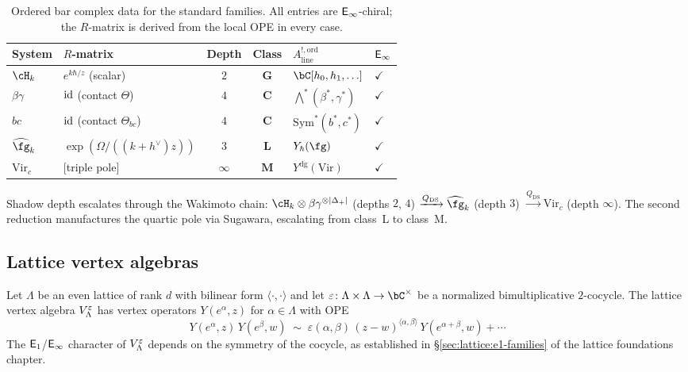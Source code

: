 \begin{table}[ht]
\centering
\renewcommand{\arraystretch}{1.4}
\begin{tabular}{llccll}
\toprule
\textbf{System} & \textbf{$R$-matrix}
 & \textbf{Depth} & \textbf{Class}
 & \textbf{$A^{!,\mathrm{ord}}_{\mathrm{line}}$}
 & \textbf{$\mathsf{E}_{\infty}$}\\
\midrule
$\cH_k$ & $e^{k\hbar/z}$ \textup{(scalar)}
 & $2$ & $\mathbf{G}$ & $\bC[h_0,h_1,\ldots]$
 & $\checkmark$ \\[2pt]
$\beta\gamma$ & $\mathrm{id}$ \textup{(contact $\Theta$)}
 & $4$ & $\mathbf{C}$
 & $\bigwedge^*(\beta^*,\gamma^*)$
 & $\checkmark$ \\[2pt]
$bc$ & $\mathrm{id}$ \textup{(contact $\Theta_{bc}$)}
 & $4$ & $\mathbf{C}$
 & $\mathrm{Sym}^*(b^*,c^*)$
 & $\checkmark$ \\[2pt]
$\widehat{\fg}_k$ & $\exp(\Omega/((k+h^\vee)z))$
 & $3$ & $\mathbf{L}$ & $Y_\hbar(\fg)$
 & $\checkmark$ \\[2pt]
$\mathrm{Vir}_c$ & \textup{[triple pole]}
 & $\infty$ & $\mathbf{M}$ & $Y^{\mathrm{dg}}(\mathrm{Vir})$
 & $\checkmark$ \\
\bottomrule
\end{tabular}
\caption{Ordered bar complex data for the standard families.
All entries are $\mathsf{E}_{\infty}$-chiral; the $R$-matrix is derived
from the local OPE in every case.}
\label{tab:free-field-contrast}
\end{table}

\begin{remark}
\label{rem:wakimoto-escalation}
Shadow depth escalates through the Wakimoto chain:
$\cH_k \otimes \beta\gamma^{\otimes |\Delta_+|}$
(depths $2$, $4$)
$\xrightarrow{Q_{\mathrm{DS}}} \widehat{\fg}_k$
(depth $3$)
$\xrightarrow{Q_{\mathrm{DS}}} \mathrm{Vir}_c$
(depth $\infty$).
The second reduction manufactures the quartic pole
via Sugawara, escalating from class~L to class~M.
\end{remark}
\subsection{Lattice vertex algebras}
\label{subsec:lattice-ordered-bar}

Let $\Lambda$ be an even lattice of rank $d$ with bilinear form
$\langle\cdot,\cdot\rangle$ and let $\varepsilon \colon \Lambda \times
\Lambda \to \bC^\times$ be a normalized bimultiplicative $2$-cocycle.
The lattice vertex algebra $V_\Lambda^\varepsilon$ has vertex operators
$Y(e^\alpha, z)$ for $\alpha \in \Lambda$ with OPE
\begin{equation}\label{eq:lattice-ope-ordered}
Y(e^\alpha, z)\,Y(e^\beta, w) \;\sim\;
 \varepsilon(\alpha,\beta)\,(z - w)^{\langle\alpha,\beta\rangle}\,
 Y(e^{\alpha+\beta}, w) + \cdots
\end{equation}
The $\mathsf{E}_1$/$\mathsf{E}_{\infty}$ character of $V_\Lambda^\varepsilon$ depends on
the symmetry of the cocycle, as established in
\S\ref{sec:lattice:e1-families} of the lattice foundations chapter.

